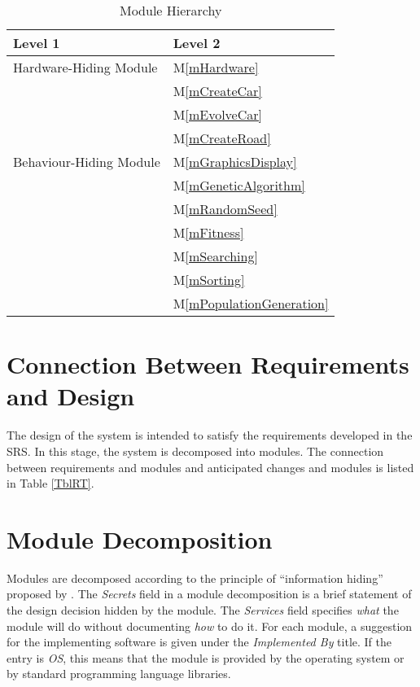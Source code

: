 \documentclass[12pt, titlepage]{article}
\newcommand{\mref}[1]{M\ref{#1}}
\begin{document}
\begin{table}[h!]
\centering
\begin{tabular}{p{} p{}}
\toprule
\textbf{Level 1} & \textbf{Level 2}\\
\midrule

{Hardware-Hiding Module} & \mref{mHardware} \\
\midrule

\multirow{7}{0.3\textwidth}{Behaviour-Hiding Module}
& \mref{mCreateCar}\\
& \mref{mEvolveCar}\\
& \mref{mCreateRoad}\\
& \mref{mGraphicsDisplay}\\
& \mref{mGeneticAlgorithm}\\
\midrule

\multirow{3}{0.3\textwidth}{Software Decision Module} 
& \mref{mRandomSeed}\\
& \mref{mFitness}\\
& \mref{mSearching}\\
& \mref{mSorting}\\
& \mref{mPopulationGeneration}\\

\bottomrule

\end{tabular}
\caption{Module Hierarchy}
\label{TblMH}
\end{table}

\section{Connection Between Requirements and Design} \label{SecConnection}

The design of the system is intended to satisfy the requirements developed in
the SRS. In this stage, the system is decomposed into modules. The connection
between requirements and modules  and anticipated changes and modules is listed 
in Table \ref{TblRT}. 

\section{Module Decomposition} \label{SecMD}

Modules are decomposed according to the principle of ``information hiding''
proposed by \citet{ParnasEtAl1984}. The \emph{Secrets} field in a module
decomposition is a brief statement of the design decision hidden by the
module. The \emph{Services} field specifies \emph{what} the module will do
without documenting \emph{how} to do it. For each module, a suggestion for the
implementing software is given under the \emph{Implemented By} title. If the
entry is \emph{OS}, this means that the module is provided by the operating
system or by standard programming language libraries. 
\end{document}

